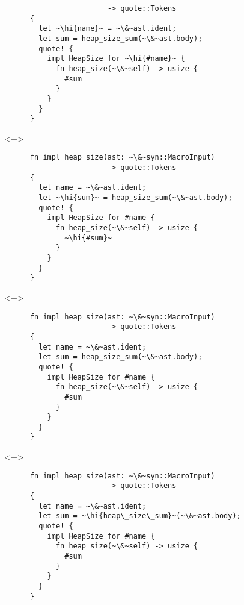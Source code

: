 \documentclass[usepdftitle=false]{beamer}
\renewcommand{\&}{\makebox[\widthof{\ampersand}][c]{\scalebox{0.9}[1.0]{\Book\ampersand}}}
\newcommand{\+}{\makebox[\widthof{+}][c]{\raisebox{-.2\height}{\scalefont{1.5}\Light+}}}
\newcommand{\hi}[1]{%
\tikz[baseline=(A.base)]
 \node[highlighting=0,inner sep=0pt,text depth=0pt] (A) {#1};%
}
\begin{document}
\begin{frame}[fragile]
\begin{onlyenv}
\begin{verbatim}
                        -> quote::Tokens
      {
        let ~\hi{name}~ = ~\&~ast.ident;
        let sum = heap_size_sum(~\&~ast.body);
        quote! {
          impl HeapSize for ~\hi{#name}~ {
            fn heap_size(~\&~self) -> usize {
              #sum
            }
          }
        }
      }
    \end{verbatim}
  \end{onlyenv}
  \begin{onlyenv}<+>
    \begin{verbatim}
      fn impl_heap_size(ast: ~\&~syn::MacroInput)
                        -> quote::Tokens
      {
        let name = ~\&~ast.ident;
        let ~\hi{sum}~ = heap_size_sum(~\&~ast.body);
        quote! {
          impl HeapSize for #name {
            fn heap_size(~\&~self) -> usize {
              ~\hi{#sum}~
            }
          }
        }
      }
    \end{verbatim}
  \end{onlyenv}
  \begin{onlyenv}<+>
    \begin{verbatim}
      fn impl_heap_size(ast: ~\&~syn::MacroInput)
                        -> quote::Tokens
      {
        let name = ~\&~ast.ident;
        let sum = heap_size_sum(~\&~ast.body);
        quote! {
          impl HeapSize for #name {
            fn heap_size(~\&~self) -> usize {
              #sum
            }
          }
        }
      }
    \end{verbatim}
  \end{onlyenv}
  \begin{onlyenv}<+>
    \begin{verbatim}
      fn impl_heap_size(ast: ~\&~syn::MacroInput)
                        -> quote::Tokens
      {
        let name = ~\&~ast.ident;
        let sum = ~\hi{heap\_size\_sum}~(~\&~ast.body);
        quote! {
          impl HeapSize for #name {
            fn heap_size(~\&~self) -> usize {
              #sum
            }
          }
        }
      }
    \end{verbatim}
  \end{onlyenv}
\end{frame}
\end{document}
